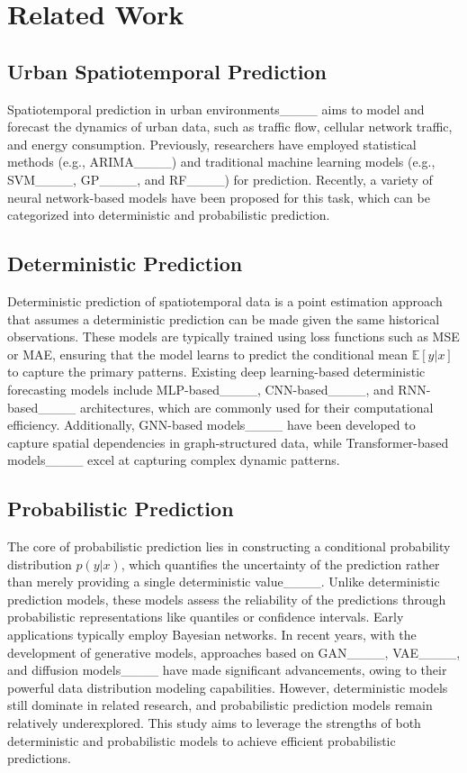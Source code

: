 \section{Related Work}
\subsection{Urban Spatiotemporal Prediction}

Spatiotemporal prediction in urban environments____ aims to model and forecast the dynamics of urban data, such as traffic flow, cellular network traffic, and energy consumption. Previously, researchers have employed statistical methods (e.g., ARIMA____) and traditional machine learning models (e.g., SVM____, GP____, and RF____) for prediction. Recently, a variety of neural network-based models have been proposed for this task, which can be categorized into deterministic and probabilistic prediction. 

\subsection{Deterministic  Prediction}

Deterministic prediction of spatiotemporal data is a point estimation approach that assumes a deterministic prediction can be made given the same historical observations. These models are typically trained using loss functions such as MSE or MAE, ensuring that the model learns to predict the conditional mean \(\mathbb{E}[y|x]\) to capture the primary patterns. Existing deep learning-based deterministic forecasting models include MLP-based____, CNN-based____, and RNN-based____ architectures, which are commonly used for their computational efficiency. Additionally, GNN-based models____ have been developed to capture spatial dependencies in graph-structured data, while Transformer-based models____ excel at capturing complex dynamic patterns. 

\subsection{Probabilistic  Prediction}


The core of probabilistic prediction lies in constructing a conditional probability distribution \( p(y|x) \), which quantifies the uncertainty of the prediction rather than merely providing a single deterministic value____. Unlike deterministic prediction models, these models 
assess the reliability of the predictions through probabilistic representations like quantiles or confidence intervals. Early applications typically employ Bayesian networks. In recent years, with the development of generative models, approaches based on GAN____, VAE____, and diffusion models____ have made significant advancements, owing to their powerful data distribution modeling capabilities. However, deterministic models still dominate in related research, and probabilistic prediction models remain relatively underexplored. This study aims to leverage the strengths of both deterministic and probabilistic models to achieve efficient probabilistic predictions.